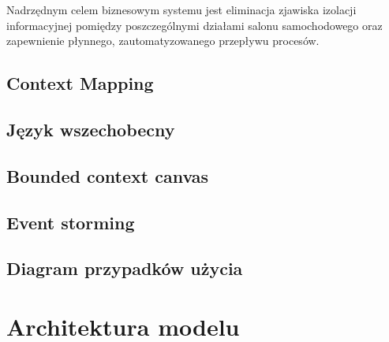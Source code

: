\documentclass[a4paper]{article}
\begin{document}
Nadrzędnym celem biznesowym systemu jest eliminacja zjawiska izolacji informacyjnej pomiędzy poszczególnymi działami salonu samochodowego oraz zapewnienie płynnego, zautomatyzowanego przepływu procesów.





\subsection{Context Mapping}


\subsection{Język wszechobecny}








\subsection{Bounded context canvas}



\subsection{Event storming}





\subsection{Diagram przypadków użycia}



\newpage
\section{Architektura modelu}

\end{document}
